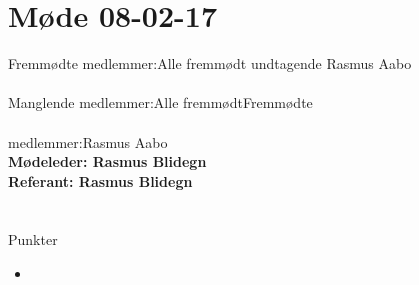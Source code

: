 \documentclass[12pt]{article}
\begin{document}
\section*{Møde 08-02-17}

Fremmødte medlemmer:Alle fremmødt undtagende Rasmus Aabo\\\\
Manglende medlemmer:Alle fremmødtFremmødte\\\\ medlemmer:Rasmus Aabo
\\\textbf{Mødeleder: Rasmus Blidegn}
\\\textbf{Referant: Rasmus Blidegn}
\\\\\\
Punkter
\begin{itemize}
\item 
\end{itemize}
\end{document}
